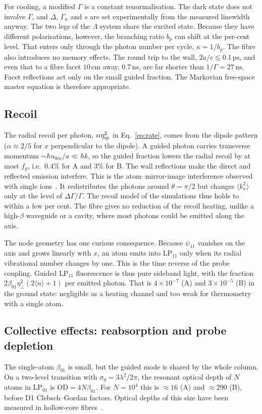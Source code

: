 \documentclass[11pt,a4paper]{article}
\newcommand{\SI}[2]{\ensuremath{#1\,\mathrm{#2}}}
\newcommand{\etaeff}{\eta_{\perp}}
\begin{document}
For cooling, a modified $\Gamma$ is a constant renormalisation. The dark state does not involve $\Gamma$, and $\Delta$, $\Gamma_n$ and $s$ are set experimentally from the measured linewidth anyway. The two legs of the $\Lambda$ system share the excited state. Because they have different polarisations, however, the branching ratio $b_p$ can shift at the per-cent level. That enters only through the photon number per cycle, $\kappa=1/b_p$. The fibre also introduces no memory effects. The round trip to the wall, $2a/c\lesssim\SI{0.1}{ps}$, and even that to a fibre facet \SI{10}{cm} away, \SI{0.7}{ns}, are far shorter than $1/\Gamma=\SI{27}{ns}$. Facet reflections act only on the small guided fraction. The Markovian free-space master equation is therefore appropriate.

\subsection{Recoil}
\label{sec:emission-recoil}
The radial recoil per photon, $\alpha\eta_{\rm sp}^2$ in Eq.~\eqref{eq:rate}, comes from the dipole pattern ($\alpha\approx2/5$ for $x$ perpendicular to the dipole). A guided photon carries transverse momentum $\sim\hbar u_{0m}/a\ll\hbar k$, so the guided fraction lowers the radial recoil by at most $f_g$, i.e.\ 0.4\% for A and 3\% for B. The wall reflections make the direct and reflected emission interfere. This is the atom--mirror-image interference observed with single ions~\cite{eschner2001}. It redistributes the photons around $\theta=\pi/2$ but changes $\langle k_x^2\rangle$ only at the level of $\Delta\Gamma/\Gamma$. The recoil model of the simulations thus holds to within a few per cent. The fibre gives no reduction of the recoil heating, unlike a high-$\beta$ waveguide or a cavity, where most photons could be emitted along the axis.

The node geometry has one curious consequence. Because $\psi_{11}$ vanishes on the axis and grows linearly with $x$, an atom emits into LP$_{11}$ only when its radial vibrational number changes by one. This is the time reverse of the probe coupling. Guided LP$_{11}$ fluorescence is thus pure sideband light, with the fraction $2\beta_{01}\etaeff^2(2\langle n\rangle+1)$ per emitted photon. That is $4\times10^{-7}$ (A) and $3\times10^{-5}$ (B) in the ground state: negligible as a heating channel and too weak for thermometry with a single atom.

\subsection{Collective effects: reabsorption and probe depletion}
\label{sec:collective}
The single-atom $\beta_{01}$ is small, but the guided mode is shared by the whole column. On a two-level transition with $\sigma_0=3\lambda^2/2\pi$, the resonant optical depth of $N$ atoms in LP$_{01}$ is $\mathrm{OD}=4N\beta_{01}$. For $N=10^4$ this is $\approx16$ (A) and $\approx290$ (B), before D1 Clebsch--Gordan factors. Optical depths of this size have been measured in hollow-core fibres~\cite{blatt2014}.
\end{document}
